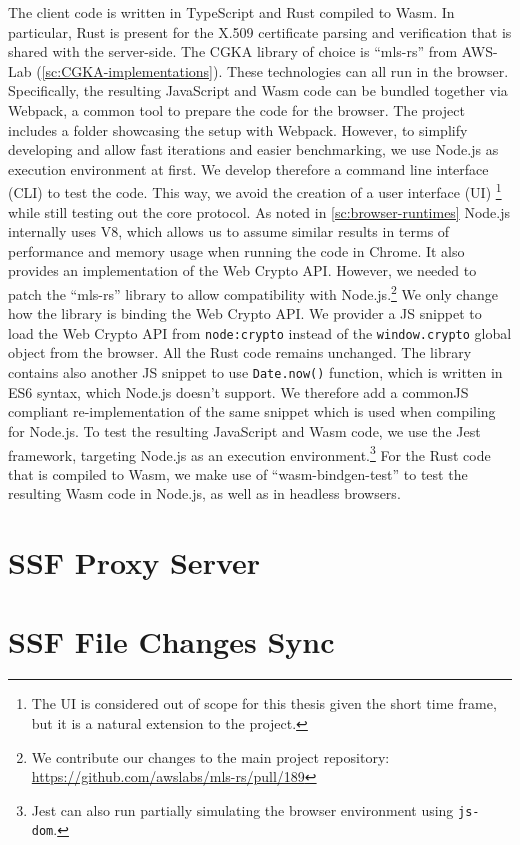 The client code is written in TypeScript and Rust compiled to Wasm.
In particular, Rust is present for the X.509 certificate parsing and
verification that is shared with the server-side.
The CGKA library of choice is ``mls-rs'' from AWS-Lab (\cref{sc:CGKA-implementations}).
These technologies can all run in the browser. Specifically,
the resulting JavaScript and Wasm code can be bundled
together via Webpack, a common tool to prepare
the code for the browser.
The project includes a folder showcasing the setup with
Webpack.
However, to simplify developing and allow fast iterations and easier benchmarking,
we use Node.js as execution environment at first.
We develop therefore a command line interface (CLI) to test the code.
This way, we avoid the creation of a user
interface (UI)
\footnote{The UI is considered out of scope for this thesis given the short time frame, but it is a natural extension to the project.}
while still testing out the core protocol. 
As noted in \cref{sc:browser-runtimes}
Node.js internally uses V8, which allows us to assume
similar results in terms of performance and memory usage
when running the code in Chrome. It also provides
an implementation of the Web Crypto API.
However, we needed to patch the ``mls-rs'' library
to allow compatibility with Node.js.\footnote{We contribute our changes to the main project repository: \url{https://github.com/awslabs/mls-rs/pull/189}}
We only change how the library is binding the Web Crypto API.
We provider a JS snippet to load the Web Crypto API from
\texttt{node:crypto} instead of the \texttt{window.crypto} global
object from the browser. All the Rust code remains
unchanged. The library contains also another JS snippet
to use \texttt{Date.now()} function, which is written in
ES6 syntax, which Node.js doesn't support.
We therefore add a commonJS compliant re-implementation
of the same snippet which is used
when compiling for Node.js.
To test the resulting JavaScript and Wasm code, we use the Jest~\cite{Jest}
framework, targeting Node.js as an execution environment.\footnote{Jest can also run partially simulating the browser environment using \texttt{js-dom}.}
For the Rust code that is compiled to Wasm, we make use of
``wasm-bindgen-test'' to test the resulting Wasm code in 
Node.js, as well as in headless browsers.



\section{SSF Proxy Server}\label{sc:ssf-proxy-server}


\section{SSF File Changes Sync}\label{sc:ssf-file-changes-sync}





